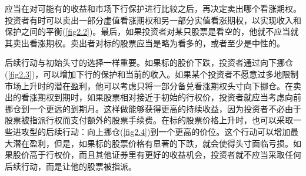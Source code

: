 应当在对可能有的收益和市场下行保护进行比较之后，再决定卖出哪个看涨期权。投资者有时可以卖出一部分虚值看涨期权和另一部分实值看涨期权，以实现收入和保护之间的平衡(\autoref{fig2.2})。最后，如果投资者对某只股票是看空的，他就不应当就其卖出看涨期权。卖出者对标的股票应当是略为看多的，或者至少是中性的。

后续行动与初始头寸的选择一样重要。如果标的股价下跌，投资者通过向下挪仓(\autoref{fig2.3})，可以增加下行的保护和当前的收入。如果某个投资者不愿意过多地限制市场上升时的潜在盈利，他可以考虑只将一部分备兑看涨期权头寸向下挪仓。在卖出的看涨期权到期时，如果股票相对接近于初始的行权价，投资者就应当考虑向前挪仓到一个更远的到期月。这样做能够获得更高的持续收益，因为投资者不必由于股票被指派行权而支付额外的股票手续费。在标的股票价格上升时，也可以采取一些进攻型的后续行动：向上挪仓(\autoref{fig2.4})到一个更高的价位。这个行动可以增加最大潜在盈利，但是，如果标的股票价格有显著的下跌，就会使得头寸面临亏损。如果股价高于行权价，而且其他证券里有更好的收益机会，投资者就不应当采取任何后续行动，而是让他的股票被指派。